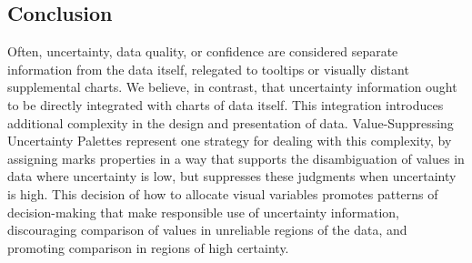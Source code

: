 \subsection{Conclusion}

Often, uncertainty, data quality, or confidence are considered separate information from the data itself, relegated to tooltips or visually distant supplemental charts. We believe, in contrast, that uncertainty information ought to be directly integrated with charts of data itself. This integration introduces additional complexity in the design and presentation of data. Value-Suppressing Uncertainty Palettes represent one strategy for dealing with this complexity, by assigning marks properties in a way that supports the disambiguation of values in data where uncertainty is low, but suppresses these judgments when uncertainty is high. This decision of how to allocate visual variables promotes patterns of decision-making that make responsible use of uncertainty information, discouraging comparison of values in unreliable regions of the data, and promoting comparison in regions of high certainty.
